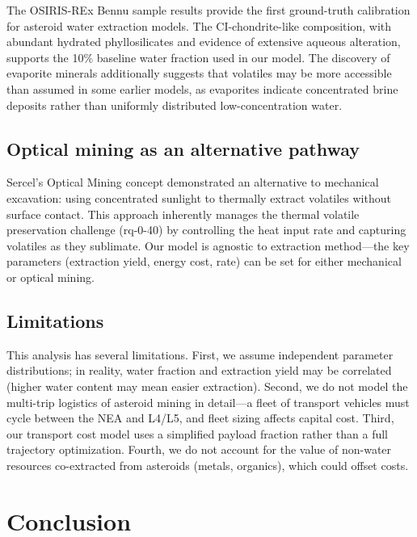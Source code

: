 \documentclass[preprint,12pt]{elsarticle}
\begin{document}
The OSIRIS-REx Bennu sample results \cite{lauretta2024,glavin2025,mccoy2025} provide the first ground-truth calibration for asteroid water extraction models. The CI-chondrite-like composition, with abundant hydrated phyllosilicates and evidence of extensive aqueous alteration, supports the 10\% baseline water fraction used in our model. The discovery of evaporite minerals \cite{mccoy2025} additionally suggests that volatiles may be more accessible than assumed in some earlier models, as evaporites indicate concentrated brine deposits rather than uniformly distributed low-concentration water.

\subsection{Optical mining as an alternative pathway}

Sercel's Optical Mining concept \cite{sercel2019} demonstrated an alternative to mechanical excavation: using concentrated sunlight to thermally extract volatiles without surface contact. This approach inherently manages the thermal volatile preservation challenge (rq-0-40) by controlling the heat input rate and capturing volatiles as they sublimate. Our model is agnostic to extraction method---the key parameters (extraction yield, energy cost, rate) can be set for either mechanical or optical mining.

\subsection{Limitations}

This analysis has several limitations. First, we assume independent parameter distributions; in reality, water fraction and extraction yield may be correlated (higher water content may mean easier extraction). Second, we do not model the multi-trip logistics of asteroid mining in detail---a fleet of transport vehicles must cycle between the NEA and L4/L5, and fleet sizing affects capital cost. Third, our transport cost model uses a simplified payload fraction rather than a full trajectory optimization. Fourth, we do not account for the value of non-water resources co-extracted from asteroids (metals, organics), which could offset costs.

\section{Conclusion}
\label{sec:conclusion}
\end{document}
